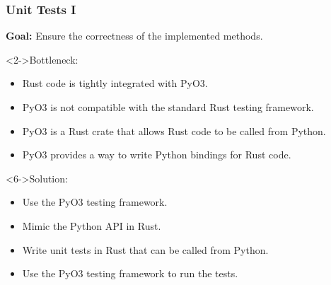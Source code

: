 \documentclass[t,english]{beamer}
\begin{document}
\begin{frame}
  \frametitle{Unit Tests I}
  \textbf{Goal:} Ensure the correctness of the implemented methods.
  
    \begin{block}<2->{Bottleneck:}
        \begin{itemize}
        \item <2-> Rust code is tightly integrated with PyO3.
        \item <3-> PyO3 is not compatible with the standard Rust testing framework.
        \item <4-> PyO3 is a Rust crate that allows Rust code to be called from Python.
        \item <5-> PyO3 provides a way to write Python bindings for Rust code.
        \end{itemize}
    \end{block}

    \begin{block}<6->{Solution:}
        \begin{itemize}
        \item <6-> Use the PyO3 testing framework.
        \item <7-> Mimic the Python API in Rust.
        \item <8-> Write unit tests in Rust that can be called from Python.
        \item <9-> Use the PyO3 testing framework to run the tests.
        \end{itemize}
    \end{block}

\end{frame}
\end{document}
